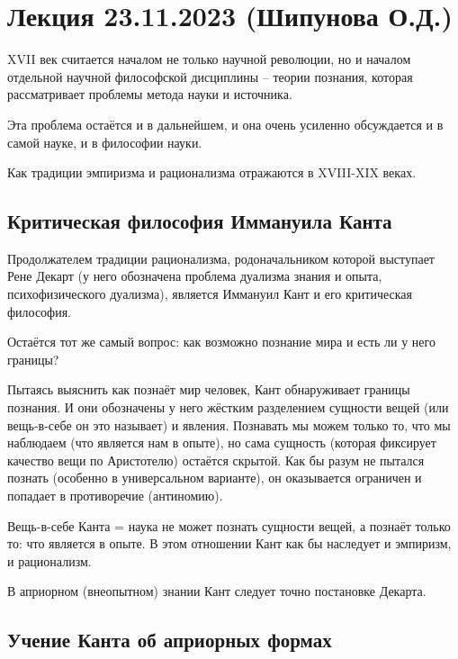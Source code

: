 \documentclass[main.tex]{subfiles}
\begin{document}
\section{Лекция 23.11.2023 (Шипунова О.Д.)}


XVII век считается началом не только научной революции, но и началом отдельной научной философской дисциплины -- теории познания, которая рассматривает проблемы метода науки и источника.

Эта проблема остаётся и в дальнейшем, и она очень усиленно обсуждается и в самой науке, и в философии науки.

Как традиции эмпиризма и рационализма отражаются в XVIII-XIX веках.

\subsection{Критическая философия Иммануила Канта}


Продолжателем традиции рационализма, родоначальником которой выступает Рене Декарт (у него обозначена проблема дуализма знания и опыта, психофизического дуализма), является Иммануил Кант и его критическая философия.

Остаётся тот же самый вопрос: как возможно познание мира и есть ли у него границы?

Пытаясь выяснить как познаёт мир человек, Кант обнаруживает границы познания.
И они обозначены у него жёстким разделением сущности вещей (или вещь-в-себе он это называет) и явления.
Познавать мы можем только то, что мы наблюдаем (что является нам в опыте), но сама сущность (которая фиксирует качество вещи по Аристотелю) остаётся скрытой.
Как бы разум не пытался познать (особенно в универсальном варианте), он оказывается ограничен и попадает в противоречие (антиномию).

Вещь-в-себе Канта = наука не может познать сущности вещей, а познаёт только то: что является в опыте.
В этом отношении Кант как бы наследует и эмпиризм, и рационализм.

В априорном (внеопытном) знании Кант следует точно постановке Декарта.

\subsection{Учение Канта об априорных формах}

\end{document}
